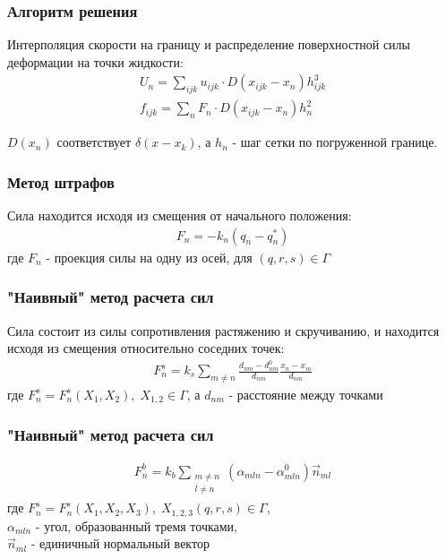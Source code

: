 \documentclass[14pt]{beamer}
\begin{document}
\begin{frame}
\frametitle{Алгоритм решения}
Интерполяция скорости на границу и распределение поверхностной силы деформации на точки жидкости:
\begin{gather}
    \label{eq:interpolation}
    U_n = \sum_{ijk}u_{ijk} \cdot D(x_{ijk} - x_n) h_{ijk}^3 \\
    \label{eq:spreading}
    f_{ijk} = \sum_n F_n \cdot D(x_{ijk} - x_n) h^2_n
\end{gather}

$D(x_n)$ соответствует $\delta(x - x_k)$, а $h_n$ - шаг сетки по погруженной границе.
\end{frame}

\begin{frame}
\frametitle{Метод штрафов}
Сила находится исходя из смещения от начального положения:
\begin{gather}
    \label{eq:penalty_method}
    F_n = -k_n (q_n - q^{*}_n)
\end{gather}
где $F_n$ - проекция силы на одну из осей, для $(q, r, s) \in \Gamma$
\end{frame}

\begin{frame}
\frametitle{"Наивный" метод расчета сил}
Сила состоит из силы сопротивления растяжению и скручиванию, и находится исходя из смещения относительно соседних точек:
\begin{gather}
    \label{eq:naive_extension}
    F^s_n =  k_s \sum_{m \ne n} \frac{d_{nm} - d^0_{nm}}{d_{nm}} \frac{x_n - x_m}{d_{nm}}
\end{gather}
где $F^s_n = F^s_n(X_1, X_2),\;X_{1,2} \in \Gamma$, а $d_{nm}$ - расстояние между точками
\end{frame}

\begin{frame}
\frametitle{"Наивный" метод расчета сил}
\begin{gather}
    \label{eq:naive_extension}
    F^b_n =  k_b \sum_{\substack{m \ne n\\l \ne n}} (\alpha_{mln} - \alpha^0_{mln}) \vec{n}_{ml}
\end{gather}
где $F^s_n = F^s_n(X_1, X_2, X_3),\;X_{1,2,3}(q, r, s) \in \Gamma$, \\
$\alpha_{mln}$ - угол, образованный тремя точками, \\
$\vec{n}_{ml}$ - единичный нормальный вектор
\end{frame}
\end{document}
